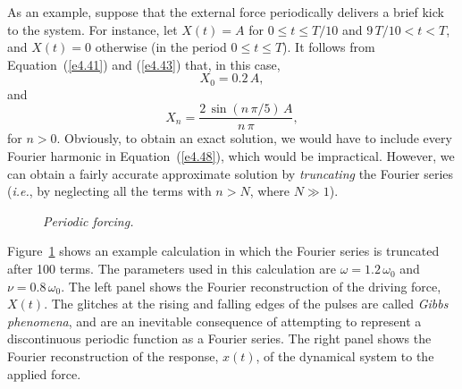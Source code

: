 As an example, suppose that the external force periodically delivers a brief kick to
the system. For instance, let
$X(t) = A$ for $0\leq t\leq T/10$ and $9\,T/10<t<T$, and  $X(t)=0$ otherwise (in the period $0\leq t\leq T$). 
It follows from Equation~(\ref{e4.41}) and (\ref{e4.43}) that, in this case,
\begin{equation}
X_0 = 0.2\,A,
\end{equation}
and
\begin{equation}
X_n = \frac{2\,\sin(n\,\pi/5)\,A}{n\,\pi},
\end{equation}
for $n>0$. Obviously, to obtain an exact solution, we would have to include
every Fourier harmonic in Equation~(\ref{e4.48}), which would be impractical. However, we can obtain
a fairly accurate approximate solution by {\em truncating}\/ the Fourier series ({\em i.e.},
by neglecting all the terms with $n>N$, where $N\gg 1$).

\begin{figure}
\epsfysize=2.25in
\centerline{}
\caption{\em Periodic forcing.}\label{ffou}   
\end{figure}

Figure~\ref{ffou} shows an example calculation in which the Fourier
series is truncated after 100 terms. The parameters used
in this calculation are $\omega = 1.2\,\omega_0$ and $\nu= 0.8\,\omega_0$.
The left panel shows the Fourier reconstruction of the driving force, $X(t)$. The
glitches at the rising and falling edges of the pulses are called {\em Gibbs
phenomena}, and are an inevitable consequence of attempting to
represent a discontinuous periodic function as a Fourier series. The
right panel shows the Fourier reconstruction of the response, $x(t)$,  of the dynamical
system to the applied force.

